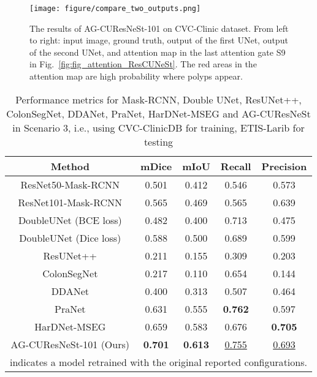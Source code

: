 \documentclass[review, sort&compress]{elsarticle}
\begin{document}
\begin{figure*}[ht!]
\centering
\texttt{[image: figure/compare\_two\_outputs.png]}
\caption{The results of AG-CUResNeSt-101 on CVC-Clinic dataset. From left to right: input image, ground truth, output of the first UNet, output of the second UNet, and attention map in the last attention gate  S9 in Fig.~\ref{fig:fig_attention_ResCUNeSt}. The red areas in the attention map are high probability where polyps appear.}
\label{fig_compare_two_UNets}
\end{figure*}





\begin{table}[ht!]
\centering
\caption{Performance metrics for Mask-RCNN, Double UNet, ResUNet++, ColonSegNet, DDANet, PraNet, HarDNet-MSEG and AG-CUResNeSt in Scenario 3, i.e., using CVC-ClinicDB for training, ETIS-Larib for testing}
\begin{tabular}{c|c c c c}
\hline
Method & mDice  & mIoU  & Recall  & Precision   \\
\hline
\hline
ResNet50-Mask-RCNN \cite{qadir2019polyp}      & 0.501   & 0.412         & 0.546  & 0.573      \\

ResNet101-Mask-RCNN \cite{qadir2019polyp}     & 0.565   & 0.469         & 0.565  & 0.639      \\

DoubleUNet (BCE loss) \cite{jha2020doubleu}  & 0.482   & 0.400         & 0.713  & 0.475      \\

DoubleUNet (Dice loss) \cite{jha2020doubleu}  & 0.588   & 0.500         & 0.689  & 0.599      \\

ResUNet++ \cite{jha2019resunet++}  & 0.211 & 0.155 & 0.309 & 0.203 \\

ColonSegNet \cite{jha2021real}  & 0.217 &    0.110 & 0.654 & 0.144 \\

DDANet \cite{tomar2020ddanet}  & 0.400 & 0.313 & 0.507 & 0.464 \\

PraNet \cite{fan2020pranet}  & 0.631 &   0.555 & \textbf{0.762}  &    0.597\\

HarDNet-MSEG \cite{huang2021hardnet}  & 0.659 &  0.583 & 0.676 & \textbf{0.705} \\
\hline
\hline
AG-CUResNeSt-101 (Ours) & \textbf{0.701}  & \textbf{0.613}         & \underline{0.755}  & \underline{0.693}      \\
\hline
\multicolumn{5}{l}{ indicates a model retrained with the original reported configurations.
}
\end{tabular}
\label{tab_clinic_etis}
\end{table}
\end{document}
